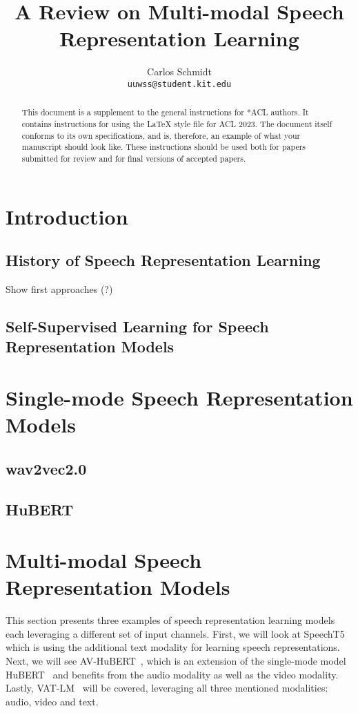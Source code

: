 \documentclass[11pt]{article}
\title{A Review on Multi-modal Speech Representation Learning}
\author{Carlos Schmidt \\\texttt{uuwss@student.kit.edu}\\}
\begin{document}
\maketitle
\begin{abstract}
This document is a supplement to the general instructions for *ACL authors. It contains instructions for using the \LaTeX{} style file for ACL 2023.
The document itself conforms to its own specifications, and is, therefore, an example of what your manuscript should look like.
These instructions should be used both for papers submitted for review and for final versions of accepted papers.
\end{abstract}

\section{Introduction}


\subsection{History of Speech Representation Learning}

Show first approaches (?) 

\subsection{Self-Supervised Learning for Speech Representation Models}




\section{Single-mode Speech Representation Models}

\subsection{wav2vec2.0}

\subsection{HuBERT}

\section{Multi-modal Speech Representation Models}

This section presents three examples of speech representation learning models each leveraging a different set of input channels. First, we will look at SpeechT5~\cite{speecht5} which is using the additional text modality for learning speech representations. Next, we will see AV-HuBERT~\cite{AV_HuBERT}, which is an extension of the single-mode model HuBERT~\cite{} and benefits from the audio modality as well as the video modality. Lastly, VAT-LM~\cite{} will be covered, leveraging all three mentioned modalities: audio, video and text.
\end{document}
